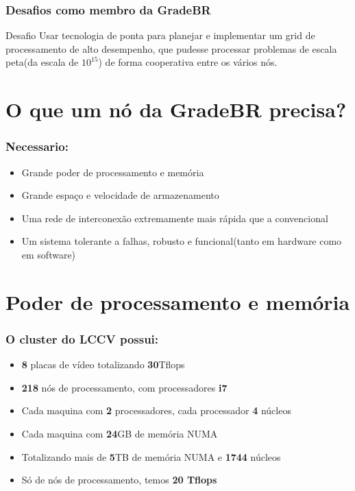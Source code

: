 \documentclass[10pt]{beamer}
\begin{document}
		\begin{frame}%
		\frametitle{Desafios como membro da GradeBR}
			\begin{block}{Desafio}
				Usar tecnologia de ponta para planejar e implementar um grid de processamento de alto desempenho, que pudesse processar problemas de escala peta(da escala de $10^{15}$) de forma cooperativa entre os vários nós.
			\end{block}
		\end{frame}

\section{O que um nó da GradeBR precisa?}
		\begin{frame}%
		\frametitle{Necessario:}
			\begin{itemize}%
				\item Grande poder de processamento e memória
				\item Grande espaço e velocidade de armazenamento
				\item Uma rede de interconexão extremamente mais rápida que a convencional
				\item Um sistema tolerante a falhas, robusto e funcional(tanto em hardware como em software)
			\end{itemize}
		\end{frame}

\section{Poder de processamento e memória}
		\begin{frame}%
		\frametitle{O cluster do LCCV possui:}
			\begin{itemize}%
				\item \textbf{8} placas de vídeo totalizando \textbf{30}Tflops
				\item \textbf{218} nós de processamento, com processadores \textbf{i7}
				\item Cada maquina com \textbf{2} processadores, cada processador \textbf{4} núcleos
				\item Cada maquina com \textbf{24}GB de memória NUMA
				\item Totalizando mais de \textbf{5}TB de memória NUMA e \textbf{1744} núcleos
				\item Só de nós de processamento, temos \textbf{20 Tflops}
			\end{itemize}
		\end{frame}
\end{document}
